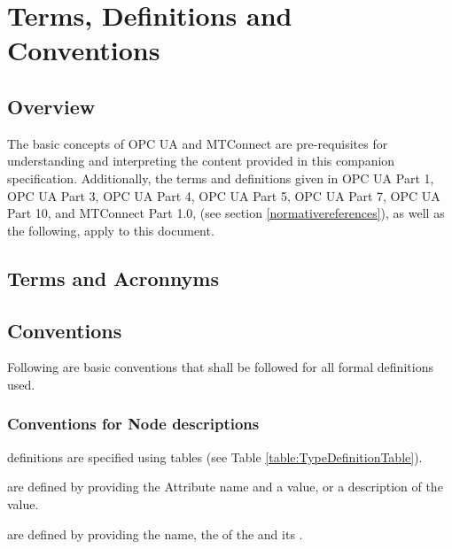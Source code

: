 \section{Terms, Definitions and Conventions}\label{termsdefinitionsconventions}

\subsection{Overview}

The basic concepts of OPC UA and MTConnect are pre-requisites for understanding and interpreting the content provided in this companion specification. Additionally, the terms and definitions given in OPC UA Part 1, OPC UA Part 3, OPC UA Part 4, OPC UA Part 5, OPC UA Part 7, OPC UA Part 10, and MTConnect Part 1.0, (see section \ref{normativereferences}), as well as the following, apply to this document. 

\subsection{Terms and Acronnyms}

\printglossary[type=opc]

\printglossary[type=mtc]

\printacronyms  

\subsection{Conventions}\label{conventions}
Following are basic conventions that shall be followed for all formal definitions used.

\subsubsection{Conventions for Node descriptions}

 definitions are specified using tables (see Table \ref{table:TypeDefinitionTable}).

 are defined by providing the Attribute name and a value, or a description of the value.

 are defined by providing the  name, the  of the  and its .

